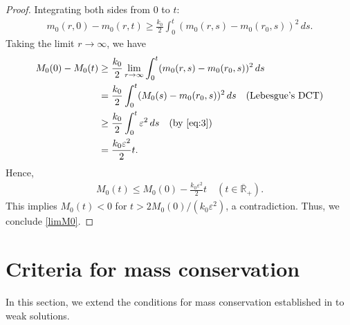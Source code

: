 \documentclass[a4paper,11pt]{article}
\def\Rb{\overline{{\mathbb R}}_+}
\def\vep{\varepsilon}
\begin{document}
\begin{proof}
  Integrating both sides from $0$ to $t$:
  \begin{align*}
    m_0 (r,0)-m_0 (r,t) \geq\frac{k_0}{2}\int_{0}^{t}(m_0(r,s)-m_0(r_0,s))^2\,ds.
  \end{align*}
  Taking the limit $r\to\infty$, we have 
  \begin{align*}
    M_0(0)-M_0(t)&\geq\frac{k_0}{2}\lim_{r\to\infty}\int_{0}^{t}(m_0(r,s)-m_0(r_0,s))^2\,ds \\
    &= \frac{k_0}{2}\int_{0}^{t}(M_0(s)-m_0(r_0,s))^2\,ds \quad\text{(Lebesgue's
    DCT)}\\
    &\geq \frac{k_0}{2}\int_{0}^{t}\varepsilon^2\,ds \quad \text{(by \eqref{eq:3})}\\
    &=\frac{k_0\varepsilon^2}{2}t.
  \end{align*}
  Hence, 
  \begin{align*}
    M_0(t)\leq M_0(0) - \frac{k_0\varepsilon^2}{2}t
    \quad (t\in \Rb).
  \end{align*}
This implies $M_0(t)<0$ for $t>2M_0(0)/(k_0\vep^2)$, a contradiction. Thus, we conclude \eqref{limM0}.
\end{proof}



\section{Criteria for mass conservation}\label{sec:5}
\setcounter{equation}{0}
In this section, we extend the conditions for mass conservation established in \cite{I-K-M2023} to weak solutions.
\end{document}
